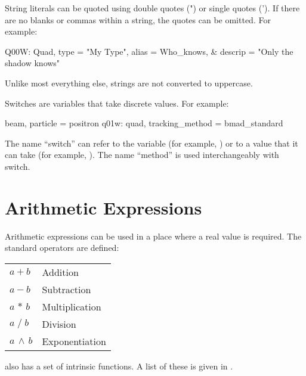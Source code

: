 {
String literals can be quoted using double quotes (") or single quotes ('). 
If there are no
blanks or commas within a string, the quotes can be omitted. For example:
\begin{example}
  Q00W: Quad, type = "My Type", alias = Who_knows, &
                                  descrip = "Only the shadow knows"
\end{example}
Unlike most everything else, strings are not converted to uppercase.

Switches are variables that take discrete values. For example:
\begin{example}
  beam, particle = positron          
  q01w: quad, tracking\_method = bmad\_standard 
\end{example}
The name ``switch'' can refer to the variable (for example,
) or to a value that it can take (for example,
). The name ``method'' is used interchangeably with switch.

\section{Arithmetic Expressions}

Arithmetic expressions can be used in a place where a real value is required.
The standard operators are defined: \hfil\break
\hspace*{0.15in}
\begin{tabular}{ll}
  $a + b$           & Addition        \\
  $a - b$           & Subtraction     \\
  $a \, \ast \, b$  & Multiplication  \\
  $a \; / \; b$     & Division        \\
  $a \, \land \, b$ & Exponentiation  \\
\end{tabular}
\bmad also has a set of intrinsic functions. A list of these is given
in .

}
